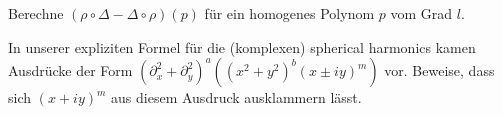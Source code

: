 \begin{sheet}
\begin{problem}
\begin{subproblem}
Berechne $(\rho\circ\Delta - \Delta\circ\rho)(p)$ für ein homogenes Polynom $p$ vom Grad $l$.
\end{subproblem}

\begin{subproblem}
In unserer expliziten Formel für die (komplexen) spherical harmonics kamen Ausdrücke der Form $(\partial_x^2+\partial_y^2)^a\left((x^2+y^2)^b (x\pm iy)^m\right)$ vor. Beweise, dass sich $(x+iy)^m$ aus diesem Ausdruck ausklammern lässt.
\end{subproblem}

\end{problem}
\end{sheet}